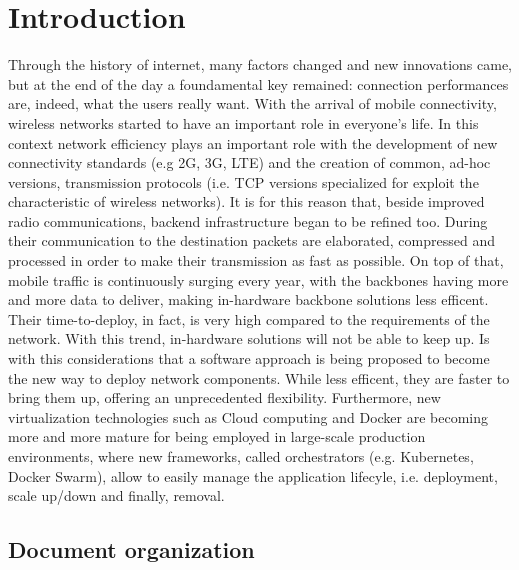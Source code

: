  
\chapter{Introduction}
\label{chap:intro}

 Through the history of internet, many factors changed and new innovations came,
 but at the end of the day a foundamental key remained: connection performances
 are, indeed, what the users really want.
With the arrival of mobile connectivity, wireless networks started to have an 
important role in everyone's life. In this context network efficiency plays 
an important role with the development of new connectivity standards (e.g 2G, 
3G, LTE) and the creation of common, ad-hoc versions, transmission protocols 
(i.e. TCP versions specialized for exploit the characteristic of 
wireless networks). It is for this reason that, beside improved radio 
communications, backend infrastructure began to be refined too. During their 
communication to the destination packets are elaborated, compressed and 
processed in order to make their transmission as fast as possible.
On top of that, mobile traffic is continuously surging every year, with the 
backbones having more and more data to deliver, making in-hardware backbone 
solutions less efficent. Their time-to-deploy, in fact, is very high compared 
to the requirements of the network. With this trend, in-hardware solutions 
will not be able to keep up. Is with this considerations that a software 
approach is being proposed to become the new way to deploy network 
components. While less efficent, they are faster to bring them up, offering an 
unprecedented flexibility.
 Furthermore, new virtualization technologies such as Cloud computing and Docker
 are becoming more and more mature for being employed in large-scale production
 environments, where new frameworks, called orchestrators (e.g. Kubernetes,
 Docker Swarm), allow to easily manage the application lifecyle, i.e.
 deployment, scale up/down and finally, removal.
 
 \section{Document organization}
 
